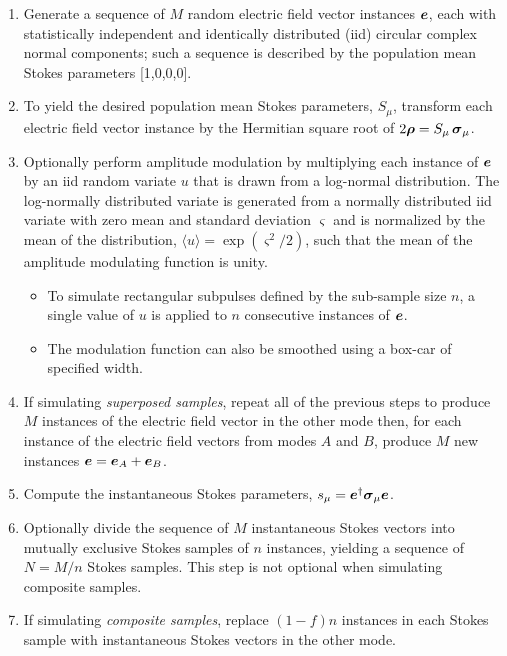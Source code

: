 \documentclass[fullpage]{article}
\newcommand{\mbf}[1]{\mbox{\boldmath $#1$}}
\newcommand{\irow}{\mu} \newcommand{\icol}{\nu}
\newcommand{\pauli}[1]{\ensuremath{\mbf{\sigma}_{#1}}}
\begin{document}
\begin{enumerate}
\item Generate a sequence of $M$ random electric field vector
  instances $\mbf{e}$, each with statistically independent and
  identically distributed (iid) circular complex normal components;
  such a sequence is described by the population mean Stokes
  parameters [1,0,0,0].
  
\item To yield the desired population mean Stokes parameters, $S_\irow$,
  transform each electric field vector instance by the Hermitian square
  root of $2\mbf\rho=S_\irow\,\pauli{\irow}$.

\item Optionally perform amplitude modulation by multiplying each
  instance of $\mbf{e}$ by an iid random variate $u$ that is drawn
  from a log-normal distribution.  The log-normally distributed
  variate is generated from a normally distributed iid variate with
  zero mean and standard deviation $\varsigma$ and is normalized by
  the mean of the distribution, $\langle u \rangle =
  \exp(\varsigma^2/2)$, such that the mean of the amplitude modulating
  function is unity.
  \begin{itemize}
  \item
  To simulate rectangular subpulses defined by the sub-sample size $n$, a
  single value of $u$ is applied to $n$ consecutive instances of
  $\mbf{e}$.
  \item
  The modulation function can also be smoothed using a box-car of specified
  width.
  \end{itemize}
  
\item If simulating \emph{superposed samples}, repeat all of the previous
  steps to produce $M$ instances of the electric field vector in the
  other mode then, for each instance of the electric field vectors
  from modes $A$ and $B$, produce $M$ new instances
  $\mbf{e}=\mbf{e}_A+\mbf{e}_B$.
  
\item Compute the instantaneous Stokes parameters,
  $s_\irow=\mbf{e}^\dagger\pauli{\irow}\mbf{e}$.

\item Optionally divide the sequence of $M$ instantaneous Stokes
  vectors into mutually exclusive Stokes samples of $n$ instances,
  yielding a sequence of $N=M/n$ Stokes samples.  This step is not
  optional when simulating composite samples.

\item If simulating \emph{composite samples}, replace $(1-f)n$ instances
  in each Stokes sample with instantaneous Stokes vectors in the
  other mode.


\end{enumerate}
\end{document}
